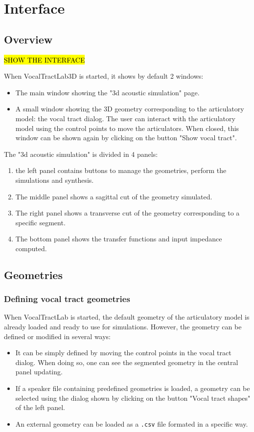 \documentclass[]{article}
\begin{document}
	\section{Interface}
	
	\subsection{Overview}
	
	\hl{SHOW THE INTERFACE}
	
	When VocalTractLab3D is started, it shows by default 2 windows:
	\begin{itemize}
		\item The main window showing the "3d acoustic simulation" page.
		\item A small window showing the 3D geometry corresponding to the articulatory model: the vocal tract dialog. The user can interact with the articulatory model using the control points to move the articulators. When closed, this window can be shown again by clicking on the button "Show vocal tract".
	\end{itemize}
	
	The "3d acoustic simulation" is divided in 4 panels:
	\begin{enumerate}
		\item the left panel contains buttons to manage the geometries, perform the simulations and synthesis.
		\item The middle panel shows a sagittal cut of the geometry simulated.
		\item The right panel shows a transverse cut of the geometry corresponding to a specific segment.
		\item The bottom panel shows the transfer functions and 
		input impedance computed. 
	\end{enumerate}

	\subsection{Geometries}

	\subsubsection{Defining vocal tract geometries}
	
	When VocalTractLab is started, the default geometry of the articulatory model is already loaded and ready to use for 
	simulations.
	However, the geometry can be defined or modified in several ways:
	\begin{itemize}
		\item It can be simply defined by moving the control points in
		the vocal tract dialog. When doing so, one can see the segmented 
		geometry in the central panel updating.
		\item If a speaker file containing predefined geometries is loaded, a geometry can be selected using the dialog shown by 
		clicking on the button "Vocal tract shapes" of the left panel.
		\item An external geometry can be loaded as a \texttt{.csv} file
		formated in a specific way. 
	\end{itemize}
\end{document}

